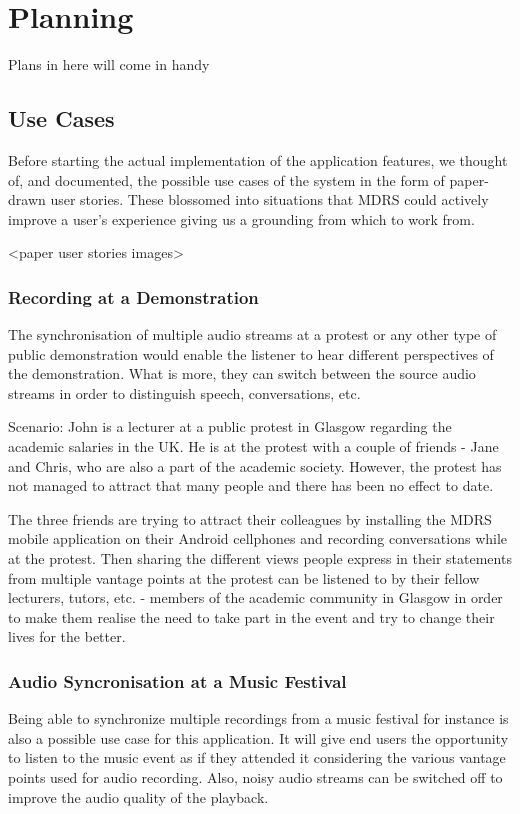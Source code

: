 \documentclass{l3proj}
\begin{document}
\chapter{Planning}
\label{Planning}

Plans in here will come in handy

\section{Use Cases}
Before starting the actual implementation of the application features, we thought of, and documented, the possible use cases of the system in the form of paper-drawn user stories. These blossomed into situations that MDRS could actively improve a user's experience giving us a grounding from which to work from.

<paper user stories images>

\subsection{Recording at a Demonstration} The synchronisation of multiple audio streams at a protest or any other type of public demonstration would enable the listener to hear different perspectives of the demonstration. What is more, they can switch between the source audio streams in order to distinguish speech, conversations, etc.

Scenario: John is a lecturer at a public protest in Glasgow regarding the academic salaries in the UK. He is at the protest with a couple of friends - Jane and Chris, who are also a part of the academic society. However, the protest has not managed to attract that many people and there has been no effect to date.

The three friends are trying to attract their colleagues by installing the MDRS mobile application on their Android cellphones and recording conversations while at the protest. Then sharing the different views people express in their statements from multiple vantage points at the protest can be listened to by their fellow lecturers, tutors, etc. - members of the academic community in Glasgow in order to make them realise the need to take part in the event and try to change their lives for the better.

\subsection{Audio Syncronisation at a Music Festival} Being able to synchronize multiple recordings from a music festival for instance is also a possible use case for this application. It will give end users the opportunity to listen to the music event as if they attended it considering the various vantage points used for audio recording. Also, noisy audio streams can be switched off to improve the audio quality of the playback.
\end{document}
